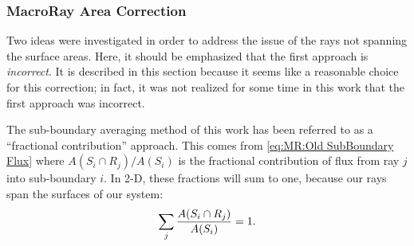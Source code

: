 {{{      \subsubsection{MacroRay Area Correction}{\label{sssec:MR:MacroRay Area Correction}
        Two ideas were investigated in order to address the issue of the rays not spanning the surface areas.
        Here, it should be emphasized that the first approach is \emph{incorrect}.
        It is described in this section because it seems like a reasonable choice for this correction; in fact, it was not realized for some time in this work that the first approach was incorrect.

        The sub-boundary averaging method of this work has been referred to as a ``fractional contribution'' approach.
        This comes from \cref{eq:MR:Old SubBoundary Flux} where $A(S_i \cap R_j) / A(S_i)$ is the fractional contribution of flux from ray $j$ into sub-boundary $i$.
        In 2-D, these fractions will sum to one, because our rays span the surfaces of our system:
        \begin{equation}\label{eq:MR:2-D Fractional Unity}
          \suml[j] \frac{A(S_i \cap R_j)}{A(S_i)} = 1.
        \end{equation}

}}}}
